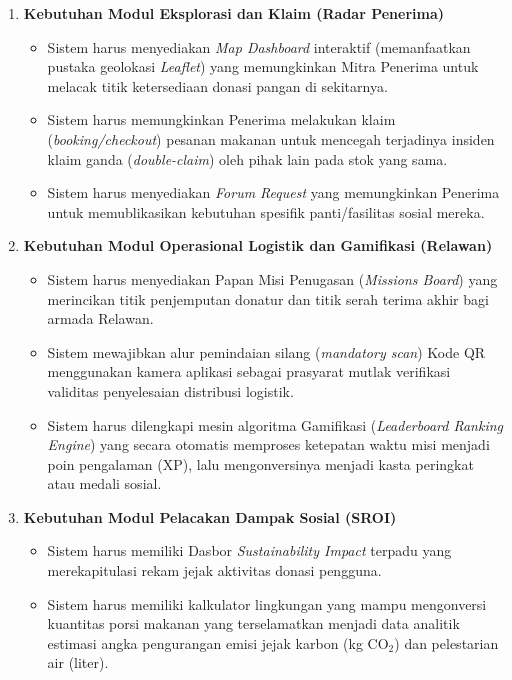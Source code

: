 \begin{enumerate}
    \item \textbf{Kebutuhan Modul Eksplorasi dan Klaim (Radar Penerima)}
    \begin{itemize}
        \item Sistem harus menyediakan \textit{Map Dashboard} interaktif (memanfaatkan pustaka geolokasi \textit{Leaflet}) yang memungkinkan Mitra Penerima untuk melacak titik ketersediaan donasi pangan di sekitarnya.
        \item Sistem harus memungkinkan Penerima melakukan klaim (\textit{booking/checkout}) pesanan makanan untuk mencegah terjadinya insiden klaim ganda (\textit{double-claim}) oleh pihak lain pada stok yang sama.
        \item Sistem harus menyediakan \textit{Forum Request} yang memungkinkan Penerima untuk memublikasikan kebutuhan spesifik panti/fasilitas sosial mereka.
    \end{itemize}

    \item \textbf{Kebutuhan Modul Operasional Logistik dan Gamifikasi (Relawan)}
    \begin{itemize}
        \item Sistem harus menyediakan Papan Misi Penugasan (\textit{Missions Board}) yang merincikan titik penjemputan donatur dan titik serah terima akhir bagi armada Relawan.
        \item Sistem mewajibkan alur pemindaian silang (\textit{mandatory scan}) Kode QR menggunakan kamera aplikasi sebagai prasyarat mutlak verifikasi validitas penyelesaian distribusi logistik.
        \item Sistem harus dilengkapi mesin algoritma Gamifikasi (\textit{Leaderboard Ranking Engine}) yang secara otomatis memproses ketepatan waktu misi menjadi poin pengalaman (XP), lalu mengonversinya menjadi kasta peringkat atau medali sosial.
    \end{itemize}

    \item \textbf{Kebutuhan Modul Pelacakan Dampak Sosial (SROI)}
    \begin{itemize}
        \item Sistem harus memiliki Dasbor \textit{Sustainability Impact} terpadu yang merekapitulasi rekam jejak aktivitas donasi pengguna.
        \item Sistem harus memiliki kalkulator lingkungan yang mampu mengonversi kuantitas porsi makanan yang terselamatkan menjadi data analitik estimasi angka pengurangan emisi jejak karbon (kg CO$_2$) dan pelestarian air (liter).
    \end{itemize}


\end{enumerate}
